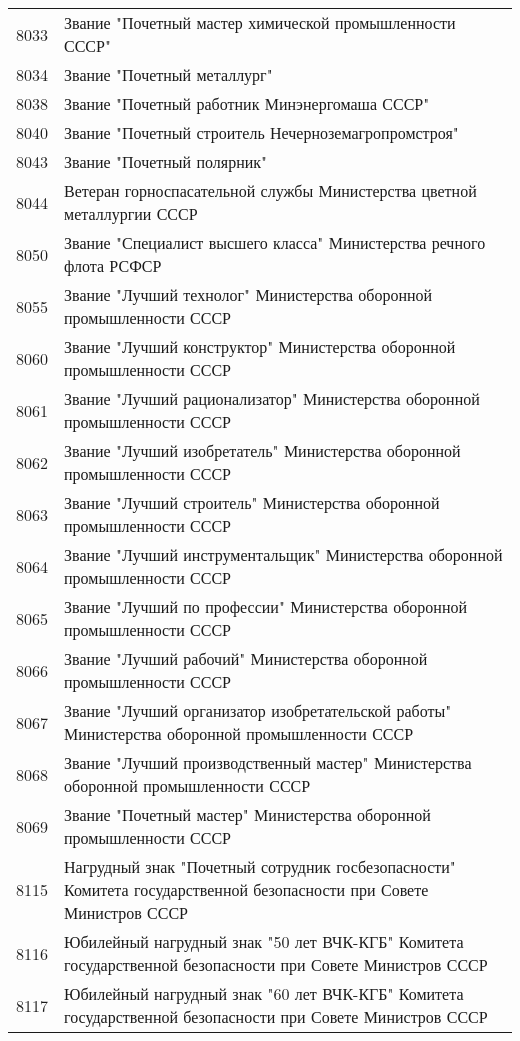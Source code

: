 \documentclass[10pt, a4paper, titlepage]{article}
\begin{document}
\begin{center}
\begin{longtable}{rp{}}
        8033 & Звание "Почетный мастер химической промышленности СССР" \\
        8034 & Звание "Почетный металлург" \\
        8038 & Звание "Почетный работник Минэнергомаша СССР" \\
        8040 & Звание "Почетный строитель Нечерноземагропромстроя" \\
        8043 & Звание "Почетный полярник" \\
        8044 & Ветеран горноспасательной службы Министерства цветной металлургии СССР \\
        8050 & Звание "Специалист высшего класса" Министерства речного флота РСФСР \\
        8055 & Звание "Лучший технолог" Министерства оборонной промышленности СССР \\
        8060 & Звание "Лучший конструктор" Министерства оборонной промышленности СССР \\
        8061 & Звание "Лучший рационализатор" Министерства оборонной промышленности СССР \\
        8062 & Звание "Лучший изобретатель" Министерства оборонной промышленности СССР \\
        8063 & Звание "Лучший строитель" Министерства оборонной промышленности СССР \\
        8064 & Звание "Лучший инструментальщик" Министерства оборонной промышленности СССР \\
        8065 & Звание "Лучший по профессии" Министерства оборонной промышленности СССР \\
        8066 & Звание "Лучший рабочий" Министерства оборонной промышленности СССР \\
        8067 & Звание "Лучший организатор изобретательской работы" Министерства оборонной промышленности СССР \\
        8068 & Звание "Лучший производственный мастер" Министерства оборонной промышленности СССР \\
        8069 & Звание "Почетный мастер" Министерства оборонной промышленности СССР \\       
        8115 & Нагрудный знак "Почетный сотрудник госбезопасности" Комитета государственной безопасности при Совете Министров СССР \\
        8116 & Юбилейный нагрудный знак "50 лет ВЧК-КГБ" Комитета государственной безопасности при Совете Министров СССР \\
        8117 & Юбилейный нагрудный знак "60 лет ВЧК-КГБ" Комитета государственной безопасности при Совете Министров СССР \\

\end{longtable}
\end{center}
\end{document}
